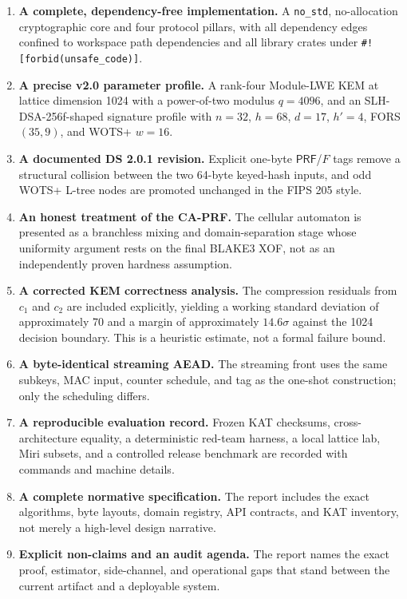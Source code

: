 \documentclass[runningheads]{llncs}
\newcommand{\PRF}{\mathsf{PRF}}
\begin{document}
\begin{enumerate}[leftmargin=*]
\item \textbf{A complete, dependency-free implementation.}  A
  \texttt{no\_std}, no-allocation cryptographic core and four protocol
  pillars, with all dependency edges confined to workspace path
  dependencies and all library crates under
  \texttt{\#![forbid(unsafe\_code)]}.
\item \textbf{A precise v2.0 parameter profile.}  A rank-four
  Module-LWE KEM at lattice dimension 1024 with a power-of-two modulus
  $q=4096$, and an SLH-DSA-256f-shaped signature profile with
  $n=32$, $h=68$, $d=17$, $h'=4$, FORS $(35,9)$, and WOTS+ $w=16$.
\item \textbf{A documented DS 2.0.1 revision.}  Explicit one-byte
  $\PRF$/$F$ tags remove a structural collision between the two
  64-byte keyed-hash inputs, and odd WOTS+ L-tree nodes are promoted
  unchanged in the FIPS 205 style.
\item \textbf{An honest treatment of the CA-PRF.}  The cellular
  automaton is presented as a branchless mixing and domain-separation
  stage whose uniformity argument rests on the final BLAKE3 XOF, not
  as an independently proven hardness assumption.
\item \textbf{A corrected KEM correctness analysis.}  The compression
  residuals from $c_1$ and $c_2$ are included explicitly, yielding a
  working standard deviation of approximately 70 and a margin of
  approximately $14.6\sigma$ against the 1024 decision boundary.  This
  is a heuristic estimate, not a formal failure bound.
\item \textbf{A byte-identical streaming AEAD.}  The streaming front
  uses the same subkeys, MAC input, counter schedule, and tag as the
  one-shot construction; only the scheduling differs.
\item \textbf{A reproducible evaluation record.}  Frozen KAT checksums,
  cross-architecture equality, a deterministic red-team harness, a
  local lattice lab, Miri subsets, and a controlled release benchmark
  are recorded with commands and machine details.
\item \textbf{A complete normative specification.}  The report includes
  the exact algorithms, byte layouts, domain registry, API contracts,
  and KAT inventory, not merely a high-level design narrative.
\item \textbf{Explicit non-claims and an audit agenda.}  The report names
  the exact proof, estimator, side-channel, and operational gaps that
  stand between the current artifact and a deployable system.
\end{enumerate}
\end{document}

